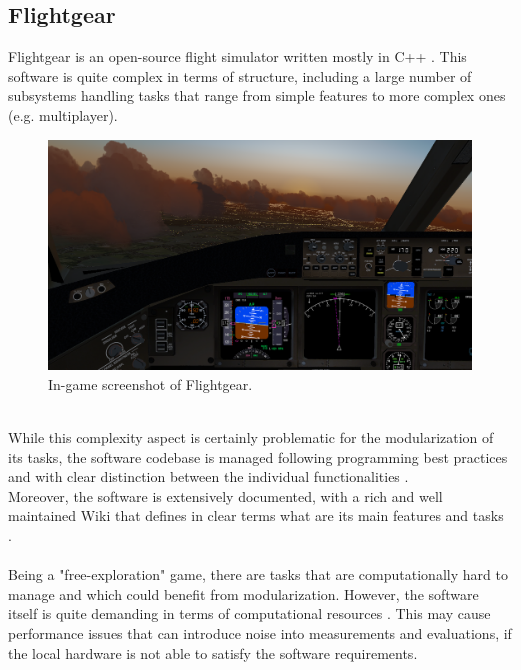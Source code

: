 \subsection{Flightgear}
Flightgear is an open-source flight simulator written mostly in C++ \cite{site:flightgear-wiki}. This software is quite complex in terms of structure, including a large number of subsystems handling tasks that range from simple features to more complex ones (e.g. multiplayer).
\begin{figure}[h!]
	\centering
	\includegraphics[width=0.8\linewidth]{"immagini/Feasibility study/Flightgear"}
	\caption[In-game screenshot of Flightgear.]{In-game screenshot of Flightgear.}
	\label{fig:flightgear}
\end{figure}
\\ While this complexity aspect is certainly problematic for the modularization of its tasks, the software codebase is managed following programming best practices and with clear distinction between the individual functionalities \cite{site:flightgear-github}. \\
Moreover, the software is extensively documented, with a rich and well maintained Wiki that defines in clear terms what are its main features and tasks \cite{site:flightgear-dev}. \\ \\
Being a "free-exploration" game, there are tasks that are computationally hard to manage and which could benefit from modularization. However, the software itself is quite demanding in terms of computational resources \cite{site:flightgear-performance}. This may cause performance issues that can introduce noise into measurements and evaluations, if the local hardware is not able to satisfy the software requirements.

